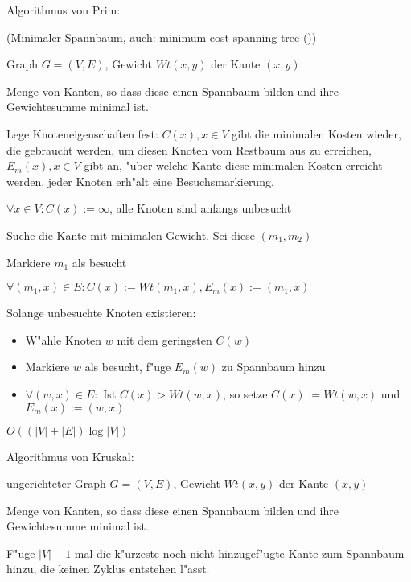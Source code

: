 \algorithm Algorithmus von Prim:{
  (Minimaler Spannbaum, auch: minimum cost spanning tree ())
  
  \given Graph $G=(V,E)$, Gewicht $Wt(x,y)$ der Kante $(x,y)$
  
  \aim Menge von Kanten, so dass diese einen Spannbaum bilden und ihre
    Gewichtesumme minimal ist.
  
  \begin{proc}
    \item Lege Knoteneigenschaften fest: $C(x),x\in V$ gibt die minimalen Kosten 
      wieder, die gebraucht werden, um diesen Knoten vom Restbaum aus zu erreichen,
      $E_m(x),x\in V$ gibt an, "uber welche Kante diese minimalen Kosten erreicht 
      werden, jeder Knoten erh"alt eine Besuchsmarkierung.
    \item $\forall x\in V: C(x):=\infty$, alle Knoten sind anfangs unbesucht
    \item Suche die Kante mit minimalen Gewicht. Sei diese $(m_1,m_2)$
    \item Markiere $m_1$ als besucht
    \item $\forall (m_1,x)\in E: C(x):=Wt(m_1,x), E_m(x):=(m_1,x)$
     \item Solange unbesuchte Knoten existieren:
      \begin{itemize}
        \item W"ahle Knoten $w$ mit dem geringsten $C(w)$
        \item Markiere $w$ als besucht, f"uge $E_m(w)$ zu Spannbaum hinzu
        \item $\forall (w,x)\in E:$ Ist $C(x)>Wt(w,x)$, so setze 
          $C(x):=Wt(w,x)$ und $E_m(x):=(w,x)$
      \end{itemize}
 \end{proc}

 \cpx $O((|V|+|E|)\log |V|)$
}
\algorithm Algorithmus von Kruskal:{
  \given ungerichteter Graph $G=(V,E)$, Gewicht $Wt(x,y)$ der Kante $(x,y)$
  
  \aim Menge von Kanten, so dass diese einen Spannbaum bilden und ihre
    Gewichtesumme minimal ist.
  
  \begin{proc}
    \item F"uge $|V|-1$ mal die k"urzeste noch nicht hinzugef"ugte Kante
      zum Spannbaum hinzu, die keinen Zyklus entstehen l"asst.
  \end{proc}
}
